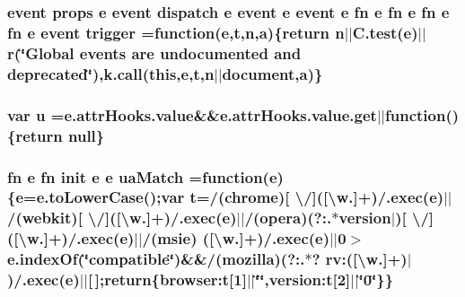 \hypertarget{jquery-migrate-1_82_81_8min_8js_a239df7e8c2edd1a4de69f6e2752cf667}{
\subsubsection[{trigger}]{ event props {\bf e} event dispatch {\bf e} event {\bf e} event {\bf e} {\bf fn} {\bf e} {\bf fn} {\bf e} {\bf fn} {\bf e} {\bf fn} {\bf e} event trigger =function({\bf e},{\bf t},{\bf n},{\bf a})\{return {\bf n}$\vert$$\vert$C.\-test({\bf e})$\vert$$\vert${\bf r}(\char`\"{}Global events are undocumented and deprecated\char`\"{}),k.\-call(this,{\bf e},{\bf t},{\bf n}$\vert$$\vert${\bf document},{\bf a})\}}}\label{jquery-migrate-1_82_81_8min_8js_a239df7e8c2edd1a4de69f6e2752cf667}
\hypertarget{jquery-migrate-1_82_81_8min_8js_accb4ce8dd4113ac0f510653e31809106}{
\subsubsection[{u}]{\setlength{\rightskip}{0pt plus 5cm}var u ={\bf e.\-attr\-Hooks.\-value}\&\&e.\-attr\-Hooks.\-value.\-get$\vert$$\vert$function()\{return null\}}}\label{jquery-migrate-1_82_81_8min_8js_accb4ce8dd4113ac0f510653e31809106}
\hypertarget{jquery-migrate-1_82_81_8min_8js_a83209627bbcd8e472c524d831c48cb9b}{
\subsubsection[{ua\-Match}]{ {\bf fn} {\bf e} {\bf fn} {\bf init} {\bf e} {\bf e} ua\-Match =function({\bf e})\{{\bf e}=e.\-to\-Lower\-Case();var {\bf t}=/(chrome)\mbox{[} \textbackslash{}/\mbox{]}(\mbox{[}\textbackslash{}w.\mbox{]}+)/.exec({\bf e})$\vert$$\vert$/(webkit)\mbox{[} \textbackslash{}/\mbox{]}(\mbox{[}\textbackslash{}w.\mbox{]}+)/.exec({\bf e})$\vert$$\vert$/(opera)(?\-:.$\ast$version$\vert$)\mbox{[} \textbackslash{}/\mbox{]}(\mbox{[}\textbackslash{}w.\mbox{]}+)/.exec({\bf e})$\vert$$\vert$/(msie) (\mbox{[}\textbackslash{}w.\mbox{]}+)/.exec({\bf e})$\vert$$\vert$0$>$e.\-index\-Of(\char`\"{}compatible\char`\"{})\&\&/(mozilla)(?\-:.$\ast$? rv\-:(\mbox{[}\textbackslash{}w.\mbox{]}+)$\vert$)/.exec({\bf e})$\vert$$\vert$\mbox{[}$\,$\mbox{]};return\{browser\-:t\mbox{[}1\mbox{]}$\vert$$\vert$\char`\"{}\char`\"{},version\-:t\mbox{[}2\mbox{]}$\vert$$\vert$\char`\"{}0\char`\"{}\}\}}}\label{jquery-migrate-1_82_81_8min_8js_a83209627bbcd8e472c524d831c48cb9b}
